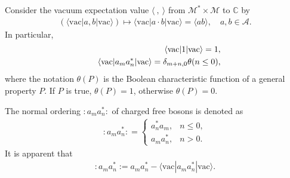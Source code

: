 \documentclass[10pt,a4paper]{amsart}
\numberwithin{equation}{section}
\begin{document}
Consider the vacuum expectation value $\langle\ , \ \rangle$ from $\mathcal{M}^{\ast}\times\mathcal{M}$ to $\mathbb{C}$ by
\begin{eqnarray}
(\langle\text{vac}|a,b|\text{vac}\rangle)\mapsto \langle\text{vac}|a\cdot b|\text{vac}\rangle=\langle ab\rangle,\quad a,b\in\mathcal{A}.
\end{eqnarray}
In particular,
\begin{eqnarray}
&&\langle\text{vac}|1|\text{vac}\rangle=1,\notag\\
&&\langle\text{vac}|a_{m}a^{\ast}_{n}|\text{vac}\rangle=\delta_{m+n,0}\theta(n\leq0),
\end{eqnarray}
where the notation $\theta(P)$ is the Boolean characteristic function of a general property $P$. If $P$ is true, $\theta(P)=1$, otherwise $\theta(P)=0$.



The normal ordering $:a_{m}a^{\ast}_{n}:$ of charged free bosons is denoted  as
\begin{eqnarray}
:a_{m}a^{\ast}_{n}: = \begin{cases}
a^{\ast}_{n}a_{m}, &n\leq0, \\
a_{m}a^{\ast}_{n}, &n>0.
\end{cases}
\end{eqnarray}
It is apparent that
\begin{eqnarray}
:a_{m}a^{\ast}_{n}:=a_{m}a^{\ast}_{n}-\langle\text{vac}|a_{m}a^{\ast}_{n}|\text{vac}\rangle.
\end{eqnarray}
\end{document}
